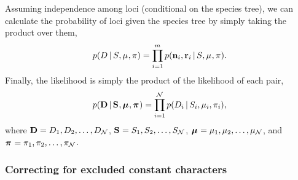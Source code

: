\begin{linenomath}
Assuming independence among loci (conditional on the species tree), we can
calculate the probability of \nloci{} loci given the species tree by
simply taking the product over them,
\begin{equation}
    \pr(\comparisondata \given \sptree, \murate, \gfreq)
    =
    \prod_{i=1}^{\nloci}
    \pr(\leafallelecounts[i], \leafredallelecounts[i] \given \sptree, \murate, \gfreq).
    \label{eq:comparisonlikelihood}
\end{equation}
Finally,  the
 likelihood  is simply the
product of the likelihood of each pair,
\begin{equation}
    \pr(
    \alldata
    \given
    \sptrees,
    \murates,
    \gfreqs)
    =
    \prod_{i=1}^{\ncomparisons}
    \pr(\comparisondata[i] \given \sptree[i], \murate[i], \gfreq[i]),
    \label{eq:collectionlikelihood}
\end{equation}
where
$\alldata = \comparisondata[1], \comparisondata[2], \ldots, \comparisondata[\ncomparisons]$,
$\sptrees = \sptree[1], \sptree[2], \ldots, \sptree[\ncomparisons]$,
$\murates = \murate[1], \murate[2], \ldots, \murate[\ncomparisons]$,
and
$\gfreqs = \gfreq[1], \gfreq[2], \ldots, \gfreq[\ncomparisons]$.
\end{linenomath}

\subsubsection{Correcting for excluded constant characters}

